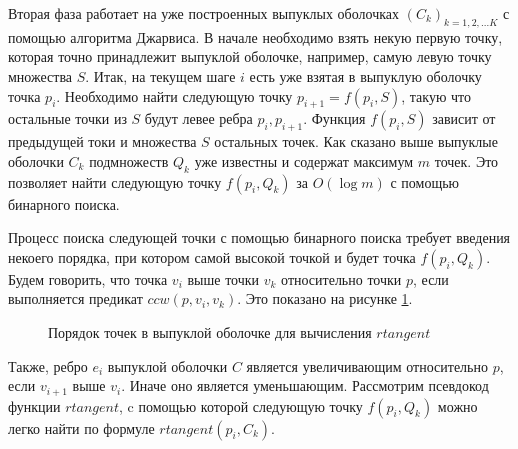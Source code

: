 Вторая фаза работает на уже построенных выпуклых оболочках $(C_k)_{k=1,2,...K}$ с помощью алгоритма Джарвиса. В начале необходимо взять некую первую точку, которая точно принадлежит выпуклой оболочке, например, самую левую точку множества $S$. Итак, на текущем шаге $i$ есть уже взятая в выпуклую оболочку точка $p_i$. Необходимо найти следующую точку $p_{i + 1} = f(p_i, S)$, такую что остальные точки из $S$ будут левее ребра $p_i, p_{i+1}$. Функция $f(p_i, S)$ зависит от предыдущей токи и множества $S$ остальных точек. Как сказано выше выпуклые оболочки $C_k$ подмножеств $Q_k$ уже известны и содержат максимум $m$ точек. Это позволяет найти следующую точку $f(p_i, Q_k)$ за $O(\log m)$ с помощью бинарного поиска.

Процесс поиска следующей точки с помощью бинарного поиска требует введения некоего порядка, при котором самой высокой точкой и будет точка $f(p_i, Q_k)$. Будем говорить, что точка $v_i$ выше точки $v_k$ относительно точки $p$, если выполняется предикат $ccw(p, v_i, v_k)$. Это показано на рисунке \ref{img:rtangent}.

\begin{figure}[H]
	\centering
	
	\caption{Порядок точек в выпуклой оболочке для вычисления $rtangent$}
	\label{img:rtangent}
\end{figure}

Также, ребро $e_i$ выпуклой оболочки $C$ является увеличивающим относительно $p$, если $v_{i+1}$ выше $v_i$. Иначе оно является уменьшающим\cite{geomal2012tangents}. Рассмотрим псевдокод функции $rtangent$, c помощью которой следующую точку $f(p_i, Q_k)$ можно легко найти по формуле $rtangent(p_i, C_k)$.



